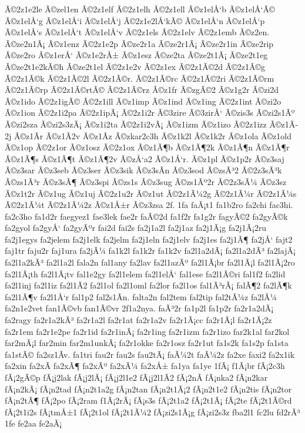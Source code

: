 {Ã©2z1e2le
Ã©zel1en
Ã©2z1elf
Ã©2z1elh
Ã©2z1ell
Ã©z1elÅ‘b
Ã©z1elÅ‘Ã©
Ã©z1elÅ‘g
Ã©z1elÅ‘i
Ã©z1elÅ‘j
Ã©2z1e2lÅ‘kÃ©
Ã©z1elÅ‘n
Ã©z1elÅ‘p
Ã©z1elÅ‘s
Ã©z1elÅ‘t
Ã©z1elÅ‘v
Ã©2z1els
Ã©2z1elv
Ã©2z1emb
Ã©z2en.
Ã©ze2n1Ã¡
Ã©z1enz
Ã©2z1e2p
Ã©ze2r1a
Ã©ze2r1Ã¡
Ã©ze2r1in
Ã©ze2rip
Ã©ze2ro
Ã©z1erÅ‘
Ã©z1e2rÅ±
Ã©z1esz
Ã©ze2ta
Ã©ze2t1Ã¡
Ã©ze2t1eg
Ã©ze2t1e2kÃ©h
Ã©ze2t1el
Ã©2z1e2v
Ã©2z1ex
Ã©2z1Ã©2d
Ã©2z1Ã©g
Ã©2z1Ã©k
Ã©2z1Ã©2l
Ã©2z1Ã©r.
Ã©2z1Ã©rc
Ã©2z1Ã©2ri
Ã©2z1Ã©rm
Ã©2z1Ã©rp
Ã©2z1Ã©rtÃ©
Ã©2z1Ã©rz
Ã©z1fr
Ã©zgÃ©2
Ã©z1g2r
Ã©zi2d
Ã©z1ido
Ã©2z1igÃ©
Ã©2z1ill
Ã©z1imp
Ã©z1ind
Ã©z1ing
Ã©2z1int
Ã©zi2o
Ã©z1ion
Ã©2z1i2pa
Ã©2z1ipÃ¡
Ã©2z1i2r
Ã©3zire
Ã©3zirÅ‘
Ã©zis3s
Ã©zi2s1Ãº
Ã©zi2sza
Ã©zi2s3zÃ¡
Ã©z1i2ta
Ã©2z1i2vÃ¡
Ã©z1izm
Ã©z1izo
Ã©2z1izz
Ã©z1Ã­2j
Ã©z1Ã­r
Ã©z1Ã­2v
Ã©z1Ã­z
Ã©zkar2c3h
Ã©z1k2l
Ã©z1k2r
Ã©z1ola
Ã©z1old
Ã©z1op
Ã©2z1or
Ã©z1osz
Ã©2z1ox
Ã©z1Ã¶b
Ã©z1Ã¶2k
Ã©z1Ã¶n
Ã©z1Ã¶r
Ã©z1Ã¶s
Ã©z1Ã¶t
Ã©z1Ã¶2v
Ã©zÅ‘a2
Ã©z1Å‘r.
Ã©z1pl
Ã©z1p2r
Ã©z3saj
Ã©z3sar
Ã©z3seb
Ã©z3ser
Ã©z3sik
Ã©z3sÃ­n
Ã©z3sod
Ã©zsÃ³2
Ã©2z3sÃ³k
Ã©zs1Ã³r
Ã©z3sÃ¶
Ã©z3spi
Ã©zs1s
Ã©z3sug
Ã©zs1Ãº2r
Ã©2z3sÃ¼
Ã©z3sz
Ã©z1t2r
Ã©z1ug
Ã©z1uj
Ã©2z1u2r
Ã©z1ut
Ã©2z1Ã¼2g
Ã©2z1Ã¼r
Ã©2z1Ã¼s
Ã©2z1Ã¼t
Ã©2z1Ã¼2z
Ã©z1Å±r
Ã©z3zsa
2f.
1fa
faÃ¡t1
fa1b2ro
fa2chi
fac3hi.
fa2c3ho
fa1d2r
faegyez1
fae3lek
fae2r
faÃ©2d
fa1f2r
fa1g2r
fagyÃ©2
fa2gyÃ©k
fa2gyol
fa2gyÅ‘
fa2gyÃºr
fai2d
fai2s
fa2j1a2l
fa2j1az
fa2j1Ã¡g
fa2j1Ã¡2ru
fa2j1egys
fa2jelem
fa2j1elk
fa2jelm
fa2j1eln
fa2j1elv
fa2j1es
fa2j1Ã¶
fa2jÅ‘
fajt2
faj1tr
faju2r
faj1ura
fa2jÃ¼
fa1k2l
fa1k2r
fa1k2v
fa2l1a2dÃ¡
fa2l1a2dÃ³
fa2lajÃ¡
fa2l1a2kÃ³
fa2l1a2l
fala2n
fal1any
fa2lav
fa2l1azÃº
fa2l1Ã¡br
fa2l1Ã¡l
fa2l1Ã¡2ro
fa2l1Ã¡th
fa2l1Ã¡tv
fal1e2gy
fa2l1elem
fa2l1elÅ‘
fal1ese
fa2l1Ã©ri
fal1f2
fa2lid
fa2l1inj
fa2l1iz
fa2l1Ã­2
fa2l1ol
fa2l1oml
fa2lor
fa2l1os
fal1Ã³rÃ¡
falÃ¶2
fa2lÃ¶k
fa2l1Ã¶v
fa2l1Å‘r
fal1p2
fal2s1Ã­n.
falta2n
fal2tem
fal2tip
fal2tÃ¼z
fa2lÃ¼
fa2n1e2vet
fan1Ã©vb
fan1Ã©vr
2f1a2nya.
faÃ³2r
fa1p2l
fa1p2r
fa2r1a2dÃ¡
fa2ragy
fa2r1a2kÃ³
fa2r1a2l
fa2r1at
fa2r1a2v
fa2r1Ã¡cc
fa2r1Ã¡l
fa2r1Ã¡2z
fa2r1em
fa2r1e2pe
fa2r1id
fa2r1inÃ¡
fa2r1ing
fa2r1izm
fa2r1izo
far2k1al
far2kol
far2mÃ¡l
far2min
far2m1unkÃ¡
fa2r1okke
fa2r1osz
fa2r1ut
fa1s2k
fa1s2p
fa1sta
fa1stÃ©
fa2sz1Ã­v.
fa1tri
fau2r
fau2s
fau2tÃ¡
faÃ¼2t
faÃ¼2z
fa2xe
faxi2
fa2x1ik
fa2xin
fa2xÃ­
fa2xÃ¶
fa2xÃº
fa2xÃ¼
fa2xÅ±
fa1ya
fa1ye
1fÃ¡
f1Ã¡br
fÃ¡2c3h
fÃ¡2gÃ©p
fÃ¡j2lak
fÃ¡j2lÃ¡
fÃ¡j2l1e2
fÃ¡j2l1Ã­2
fÃ¡2nÃ­
fÃ¡nka2
fÃ¡n2kar
fÃ¡n2kÃ¡
fÃ¡n2tad
fÃ¡n2t1a2g
fÃ¡n2tan
fÃ¡n2t1Ã¡2
fÃ¡n2t1e2
fÃ¡n2tis
fÃ¡n2tor
fÃ¡n2tÃ¶
fÃ¡2po
fÃ¡2ram
f1Ã¡2rÃ¡
fÃ¡s3s
fÃ¡2t1a2
fÃ¡2t1Ã¡
fÃ¡2te
fÃ¡2t1Ã©rd
fÃ¡2t1i2s
fÃ¡tmÅ±1
fÃ¡2t1ol
fÃ¡2t1Ã¼2
fÃ¡zi2s1Ã¡g
fÃ¡zi2s3z
fba2l1
fc2lu
fd2rÃ³
1fe
fe2aa
fe2aÃ¡
}
